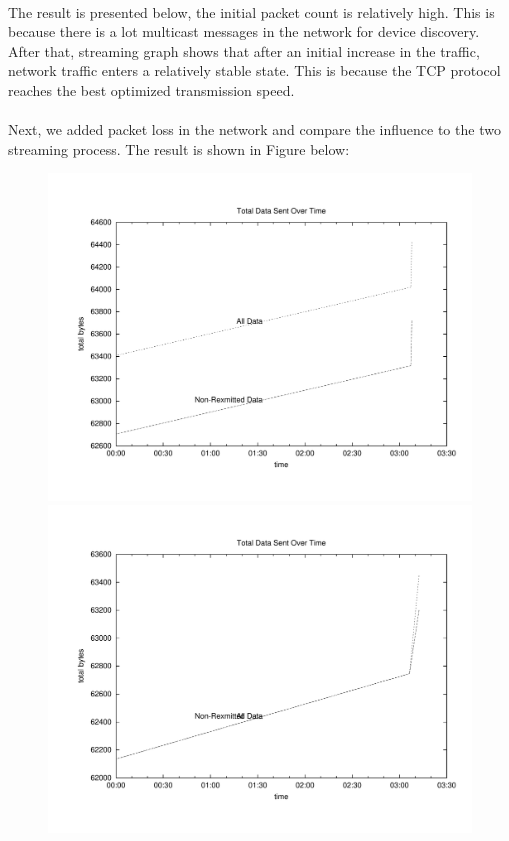 \\
The result is presented below, the initial packet count is relatively high. This is because there is a lot multicast messages in the network for device discovery. After that, streaming graph shows that after an initial increase in the traffic, network traffic enters a relatively stable state. This is because the TCP protocol reaches the best optimized transmission speed.\\
\\
Next, we added packet loss in the network and compare the influence to the two streaming process. The result is shown in Figure below:
\begin{figure}[H]
\begin{minipage}[b]{0.45\linewidth}
\centering
\includegraphics[width=\textwidth]{charts/AirPlay_traffic_data}
\end{minipage}
\begin{minipage}[b]{0.45\linewidth}
\centering
\includegraphics[width=\textwidth]{charts/AirPlay_traffic_5loss_data}

\end{minipage}
\end{figure}
